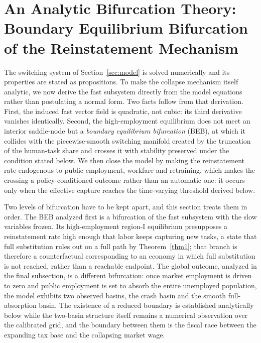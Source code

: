 \documentclass[review,12pt]{elsarticle}
\theoremstyle{plain}
\theoremstyle{definition}
\theoremstyle{remark}
\begin{document}
\section{An Analytic Bifurcation Theory: Boundary Equilibrium Bifurcation of the Reinstatement Mechanism}
\label{sec:bifurcation}
The switching system of Section~\ref{sec:model} is solved numerically and its properties are stated as propositions. To make the collapse mechanism itself analytic, we now derive the fast subsystem directly from the model equations rather than postulating a normal form. Two facts follow from that derivation. First, the induced fast vector field is quadratic, not cubic: its third derivative vanishes identically. Second, the high-employment equilibrium does not meet an interior saddle-node but a \emph{boundary equilibrium bifurcation} (BEB), at which it collides with the piecewise-smooth switching manifold created by the truncation of the human-task share and crosses it with stability preserved under the condition stated below. We then close the model by making the reinstatement rate endogenous to public employment, workfare and retraining, which makes the crossing a policy-conditioned outcome rather than an automatic one: it occurs only when the effective capture reaches the time-varying threshold derived below.

Two levels of bifurcation have to be kept apart, and this section treats them in order. The BEB analyzed first is a bifurcation of the fast subsystem with the slow variables frozen. Its high-employment region-I equilibrium presupposes a reinstatement rate high enough that labor keeps capturing new tasks, a state that full substitution rules out on a full path by Theorem~\ref{thm1}; that branch is therefore a counterfactual corresponding to an economy in which full substitution is not reached, rather than a reachable endpoint. The global outcome, analyzed in the final subsection, is a different bifurcation: once market employment is driven to zero and public employment is set to absorb the entire unemployed population, the model exhibits two observed basins, the crash basin and the smooth full-absorption basin. The existence of a reduced boundary is established analytically below while the two-basin structure itself remains a numerical observation over the calibrated grid, and the boundary between them is the fiscal race between the expanding tax base and the collapsing market wage.
\end{document}
